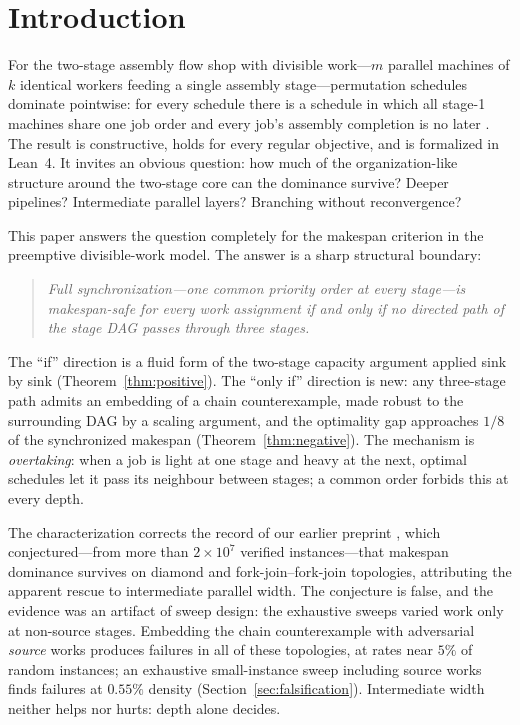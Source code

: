 \documentclass[sn-mathphys,NameDate]{sn-jnl}
\theoremstyle{thmstyleone}
\theoremstyle{thmstylethree}
\theoremstyle{thmstyletwo}
\begin{document}
\section{Introduction}
\label{sec:intro}

For the two-stage assembly flow shop with divisible work---$m$
parallel machines of $k$ identical workers feeding a single
assembly stage---permutation schedules dominate pointwise: for
every schedule there is a schedule in which all stage-1
machines share one job order and every job's assembly
completion is no later \citep{bowmanA}. The result is
constructive, holds for every regular objective, and is
formalized in Lean~4. It invites an obvious question: how much
of the organization-like structure around the two-stage core
can the dominance survive? Deeper pipelines? Intermediate
parallel layers? Branching without reconvergence?

This paper answers the question completely for the makespan
criterion in the preemptive divisible-work model. The answer
is a sharp structural boundary:

\begin{quote}
\emph{Full synchronization---one common priority order at
every stage---is makespan-safe for every work assignment if
and only if no directed path of the stage DAG passes through
three stages.}
\end{quote}

The ``if'' direction is a fluid form of the two-stage capacity
argument applied sink by sink
(Theorem~\ref{thm:positive}). The ``only if'' direction is
new: any three-stage path admits an embedding of a chain
counterexample, made robust to the surrounding DAG by a
scaling argument, and the optimality gap approaches $1/8$ of
the synchronized makespan (Theorem~\ref{thm:negative}). The
mechanism is \emph{overtaking}: when a job is light at one
stage and heavy at the next, optimal schedules let it pass its
neighbour between stages; a common order forbids this at every
depth.

The characterization corrects the record of our earlier
preprint \citep{bowmanA}, which conjectured---from more than
$2 \times 10^7$ verified instances---that makespan dominance
survives on diamond and fork-join--fork-join topologies,
attributing the apparent rescue to intermediate parallel
width. The conjecture is false, and the evidence was an
artifact of sweep design: the exhaustive sweeps varied work
only at non-source stages. Embedding the chain counterexample
with adversarial \emph{source} works produces failures in all
of these topologies, at rates near $5\%$ of random instances;
an exhaustive small-instance sweep including source works
finds failures at $0.55\%$ density
(Section~\ref{sec:falsification}). Intermediate width neither
helps nor hurts: depth alone decides.
\end{document}

